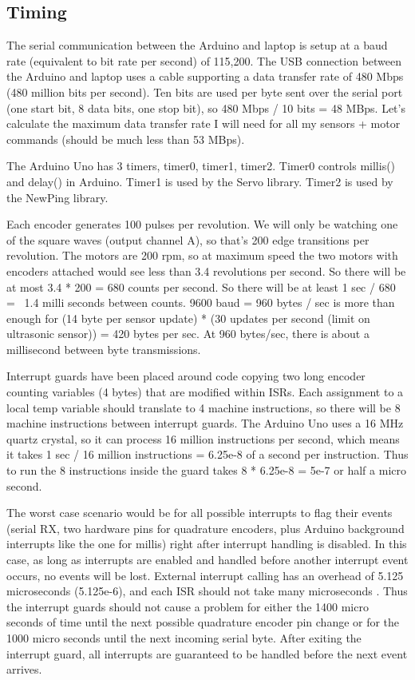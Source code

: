 \subsection{Timing}
The serial communication between the Arduino and laptop is setup at a baud rate (equivalent to bit rate per second) of 115,200. The USB connection between the Arduino and laptop uses a cable supporting a data transfer rate of 480 Mbps (480 million bits per second). Ten bits are used per byte sent over the serial port (one start bit, 8 data bits, one stop bit), so 480 Mbps / 10 bits = 48 MBps. Let’s calculate the maximum data transfer rate I will need for all my sensors + motor commands (should be much less than 53 MBps).

The Arduino Uno has 3 timers, timer0, timer1, timer2. Timer0 controls millis() and delay() in Arduino. Timer1 is used by the Servo library. Timer2 is used by the NewPing library.

Each encoder generates 100 pulses per revolution. We will only be watching one of the square waves (output channel A), so that’s 200 edge transitions per revolution. The motors are 200 rpm, so at maximum speed the two motors with encoders attached would see less than 3.4 revolutions per second. So there will be at most 3.4 * 200 = 680 counts per second. So there will be at least 1 sec / 680 =~ 1.4 milli seconds between counts.
9600 baud = 960 bytes / sec is more than enough for (14 byte per sensor update) * (30 updates per second (limit on ultrasonic sensor)) = 420 bytes per sec. At 960 bytes/sec, there is about a millisecond between byte transmissions. 

Interrupt guards have been placed around code copying two long encoder counting variables (4 bytes) that are modified within ISRs. Each assignment to a local temp variable should translate to 4 machine instructions, so there will be 8 machine instructions between interrupt guards. The Arduino Uno uses a 16 MHz quartz crystal, so it can process 16 million instructions per second, which means it takes 1 sec / 16 million instructions = 6.25e-8 of a second per instruction. Thus to run the 8 instructions inside the guard takes 8 * 6.25e-8 = 5e-7 or half a micro second. 

The worst case scenario would be for all possible interrupts to flag their events (serial RX, two hardware pins for quadrature encoders, plus Arduino background interrupts like the one for millis) right after interrupt handling is disabled. In this case, as long as interrupts are enabled and handled before another interrupt event occurs, no events will be lost. External interrupt calling has an overhead of 5.125 microseconds (5.125e-6), and each ISR should not take many microseconds \cite{gammonInterrupts}. Thus the interrupt guards should not cause a problem for either the 1400 micro seconds of time until the next possible quadrature encoder pin change or for the 1000 micro seconds until the next incoming serial byte. After exiting the interrupt guard, all interrupts are guaranteed to be handled before the next event arrives.

